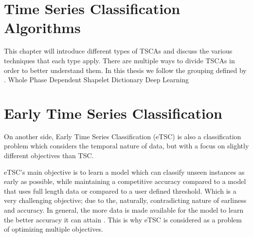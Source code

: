 \section{Time Series Classification Algorithms}
\label{SectionTSCA}
This chapter will introduce different types of TSCAs and discuss the various techniques that each type apply.
There are multiple ways to divide TSCAs in order to better understand them.
In this thesis we follow the grouping defined by \cite{bagnall2017great}.
{Whole}
{Phase Dependent}
{Shapelet}
{Dictionary}
{Deep Learning}

\section{Early Time Series Classification}
\label{EarlyTimeSeriesClassification}
On another side, Early Time Series Classification (eTSC) is also a classification problem which considers the temporal nature of data,
but with a focus on slightly different objectives than TSC.

eTSC's main objective is to learn a model which can classify unseen instances as early as possible,
while maintaining a competitive accuracy compared to a model that uses full length data or compared to a user defined threshold\cite{xing2009early}.
Which is a very challenging objective; due to the, naturally, contradicting nature of earliness and accuracy.
In general, the more data is made available for the model to learn the better accuracy it can attain \cite{mori2019early,tavenard2016cost,xing2012early,mori2017reliable}.
This is why eTSC is considered as a problem of optimizing multiple objectives.

